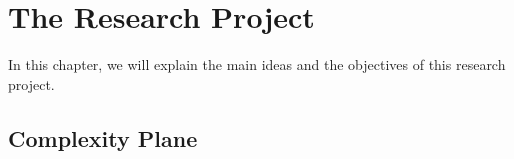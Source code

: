 \chapter{The Research Project}\label{C:aim}

In this chapter, we will explain the main ideas and the objectives of this research project.
\section{Complexity Plane}


